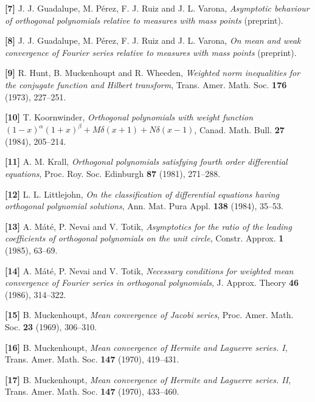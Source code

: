 \item {{\bf [7]}} {\rm J. J. Guadalupe, M. P\'erez, F. J. Ruiz and J. L. Varona,
{\it Asymptotic behaviour of orthogonal polynomials relative to measures with
mass points} (preprint).}

\item {{\bf [8]}} {\rm J. J. Guadalupe, M. P\'erez, F. J. Ruiz and J. L. Varona,
{\it On mean and weak convergence of Fourier series relative to measures with
mass points} (preprint).}

\item {{\bf [9]}} R. Hunt, B. Muckenhoupt and R. Wheeden, {\it Weighted norm
inequalities for the conjugate function and Hilbert transform}, Trans. Amer.
Math. Soc. {\bf 176} (1973), 227--251.

\item {{\bf [10]}} T. Koornwinder, {\it Orthogonal polynomials with weight
function $(1-x)^{\alpha}(1+x)^{\beta}+M\delta(x+1)+N\delta(x-1)$}, Canad. Math.
Bull. {\bf 27} (1984), 205--214.

\item {{\bf [11]}} A. M. Krall, {\it Orthogonal polynomials satisfying fourth
order differential equations}, Proc. Roy. Soc. Edinburgh {\bf 87} (1981),
271--288.

\item {{\bf [12]}} L. L. Littlejohn, {\it On the classification of differential
equations having orthogonal polynomial solutions}, Ann. Mat. Pura Appl. {\bf
138} (1984), 35--53.

\item {{\bf [13]}} A. M\'at\'e, P. Nevai and V. Totik, {\it Asymptotics for the
ratio of the leading coefficients of orthogonal polynomials on the unit
circle}, Constr. Approx. {\bf 1} (1985), 63--69.

\item {{\bf [14]}} A. M\'at\'e, P. Nevai and V. Totik, {\it Necessary
conditions for weighted mean convergence of Fourier series in orthogonal
polynomials}, J. Approx. Theory {\bf 46} (1986), 314--322.

\item {{\bf [15]}} B. Muckenhoupt, {\it Mean convergence of Jacobi series},
Proc. Amer. Math. Soc. {\bf 23} (1969), 306--310.

\item {{\bf [16]}} B. Muckenhoupt, {\it Mean convergence of Hermite and
Laguerre series. I}, Trans. Amer. Math. Soc. {\bf 147} (1970), 419--431.

\item {{\bf [17]}} B. Muckenhoupt, {\it Mean convergence of Hermite and
Laguerre series. II}, Trans. Amer. Math. Soc. {\bf 147} (1970), 433--460.


